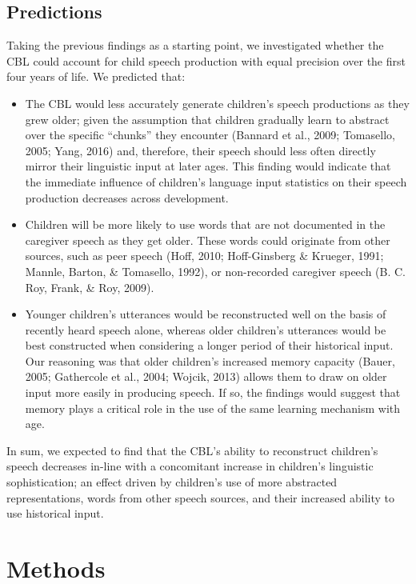 \documentclass[man,mask,floatsintext]{apa6}
\providecommand{\tightlist}{%
  \setlength{\itemsep}{0pt}\setlength{\parskip}{0pt}}
\begin{document}
\subsection{Predictions}\label{predictions}

Taking the previous findings as a starting point, we investigated
whether the CBL could account for child speech production with equal
precision over the first four years of life. We predicted that:

\begin{itemize}
\tightlist
\item
  The CBL would less accurately generate children's speech productions
  as they grew older; given the assumption that children gradually learn
  to abstract over the specific \enquote{chunks} they encounter (Bannard
  et al., 2009; Tomasello, 2005; Yang, 2016) and, therefore, their
  speech should less often directly mirror their linguistic input at
  later ages. This finding would indicate that the immediate influence
  of children's language input statistics on their speech production
  decreases across development.
\item
  Children will be more likely to use words that are not documented in
  the caregiver speech as they get older. These words could originate
  from other sources, such as peer speech (Hoff, 2010; Hoff-Ginsberg \&
  Krueger, 1991; Mannle, Barton, \& Tomasello, 1992), or non-recorded
  caregiver speech (B. C. Roy, Frank, \& Roy, 2009).
\item
  Younger children's utterances would be reconstructed well on the basis
  of recently heard speech alone, whereas older children's utterances
  would be best constructed when considering a longer period of their
  historical input. Our reasoning was that older children's increased
  memory capacity (Bauer, 2005; Gathercole et al., 2004; Wojcik, 2013)
  allows them to draw on older input more easily in producing speech. If
  so, the findings would suggest that memory plays a critical role in
  the use of the same learning mechanism with age.
\end{itemize}

In sum, we expected to find that the CBL's ability to reconstruct
children's speech decreases in-line with a concomitant increase in
children's linguistic sophistication; an effect driven by children's use
of more abstracted representations, words from other speech sources, and
their increased ability to use historical input.

\section{Methods}\label{methods}
\end{document}
